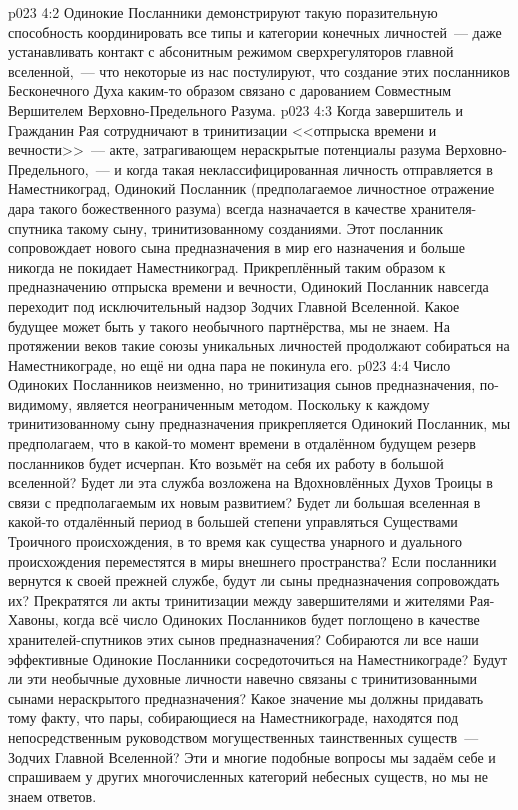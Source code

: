 \vs p023 4:2 Одинокие Посланники демонстрируют такую поразительную способность координировать все типы и категории конечных личностей~--- даже устанавливать контакт с абсонитным режимом сверхрегуляторов главной вселенной,~--- что некоторые из нас постулируют, что создание этих посланников Бесконечного Духа каким\hyp{}то образом связано с дарованием Совместным Вершителем Верховно\hyp{}Предельного Разума.
\vs p023 4:3 \pc Когда завершитель и Гражданин Рая сотрудничают в тринитизации <<отпрыска времени и вечности>>~--- акте, затрагивающем нераскрытые потенциалы разума Верховно\hyp{}Предельного,~--- и когда такая неклассифицированная личность отправляется в Наместникоград, Одинокий Посланник (предполагаемое личностное отражение дара такого божественного разума) всегда назначается в качестве хранителя\hyp{}спутника такому сыну, тринитизованному созданиями. Этот посланник сопровождает нового сына предназначения в мир его назначения и больше никогда не покидает Наместникоград. Прикреплённый таким образом к предназначению отпрыска времени и вечности, Одинокий Посланник навсегда переходит под исключительный надзор Зодчих Главной Вселенной. Какое будущее может быть у такого необычного партнёрства, мы не знаем. На протяжении веков такие союзы уникальных личностей продолжают собираться на Наместникограде, но ещё ни одна пара не покинула его.
\vs p023 4:4 Число Одиноких Посланников неизменно, но тринитизация сынов предназначения, по\hyp{}видимому, является неограниченным методом. Поскольку к каждому тринитизованному сыну предназначения прикрепляется Одинокий Посланник, мы предполагаем, что в какой\hyp{}то момент времени в отдалённом будущем резерв посланников будет исчерпан. Кто возьмёт на себя их работу в большой вселенной? Будет ли эта служба возложена на Вдохновлённых Духов Троицы в связи с предполагаемым их новым развитием? Будет ли большая вселенная в какой\hyp{}то отдалённый период в большей степени управляться Существами Троичного происхождения, в то время как существа унарного и дуального происхождения переместятся в миры внешнего пространства? Если посланники вернутся к своей прежней службе, будут ли сыны предназначения сопровождать их? Прекратятся ли акты тринитизации между завершителями и жителями Рая\hyp{}Хавоны, когда всё число Одиноких Посланников будет поглощено в качестве хранителей\hyp{}спутников этих сынов предназначения? Собираются ли все наши эффективные Одинокие Посланники сосредоточиться на Наместникограде? Будут ли эти необычные духовные личности навечно связаны с тринитизованными сынами нераскрытого предназначения? Какое значение мы должны придавать тому факту, что пары, собирающиеся на Наместникограде, находятся под непосредственным руководством могущественных таинственных существ~--- Зодчих Главной Вселенной? Эти и многие подобные вопросы мы задаём себе и спрашиваем у других многочисленных категорий небесных существ, но мы не знаем ответов.
